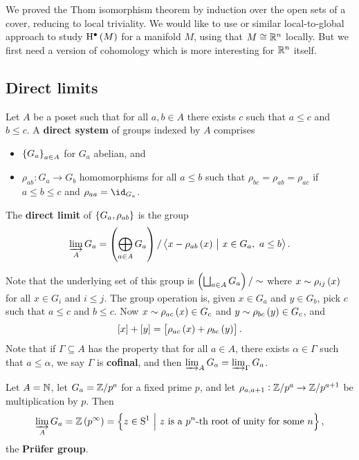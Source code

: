 We proved the Thom isomorphism theorem by induction over the open sets of a cover, reducing to local triviality. We would like to use or similar local-to-global approach to study $ \H^\bullet\br{M} $ for a manifold $ M $, using that $ M \cong \mathbb{R}^n $ locally. But we first need a version of cohomology which is more interesting for $ \mathbb{R}^n $ itself.

\subsection{Direct limits}

Let $ A $ be a poset such that for all $ a, b \in A $ there exists $ c $ such that $ a \le c $ and $ b \le c $. A \textbf{direct system} of groups indexed by $ A $ comprises
\begin{itemize}
\item $ \cbr{G_a}_{a \in A} $ for $ G_a $ abelian, and
\item $ \rho_{ab} : G_a \to G_b $ homomorphisms for all $ a \le b $ such that $ \rho_{bc} = \rho_{ab} = \rho_{ac} $ if $ a \le b \le c $ and $ \rho_{aa} = \id_{G_a} $.
\end{itemize}

\begin{definition*}
The \textbf{direct limit} of $ \cbr{G_a, \rho_{ab}} $ is the group
$$ \varinjlim_A G_a = \br{\bigoplus_{a \in A} G_a} / \abr{x - \rho_{ab}\br{x} \st x \in G_a, \ a \le b}. $$
\end{definition*}

Note that the underlying set of this group is $ \br{\bigsqcup_{a \in A} G_a} / \sim $ where $ x \sim \rho_{ij}\br{x} $ for all $ x \in G_i $ and $ i \le j $. The group operation is, given $ x \in G_a $ and $ y \in G_b $, pick $ c $ such that $ a \le c $ and $ b \le c $. Now $ x \sim \rho_{ac}\br{x} \in G_c $ and $ y \sim \rho_{bc}\br{y} \in G_c $, and
$$ \sbr{x} + \sbr{y} = \sbr{\rho_{ac}\br{x} + \rho_{bc}\br{y}}. $$
Note that if $ \Gamma \subseteq A $ has the property that for all $ a \in A $, there exists $ \alpha \in \Gamma $ such that $ a \le \alpha $, we say $ \Gamma $ is \textbf{cofinal}, and then $ \varinjlim_A G_a = \varinjlim_\Gamma G_a $.

\begin{example*}
Let $ A = \mathbb{N} $, let $ G_a = \mathbb{Z} / p^a $ for a fixed prime $ p $, and let $ \rho_{a, a + 1} : \mathbb{Z} / p^a \to \mathbb{Z} / p^{a + 1} $ be multiplication by $ p $. Then
$$ \varinjlim_A G_a = \ZZ\br{p^\infty} = \cbr{z \in \S^1 \st z \ \text{is a $ p^n $-th root of unity for some} \ n}, $$
the \textbf{Pr\"ufer group}.
\end{example*}

